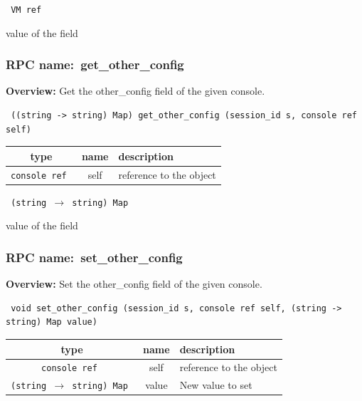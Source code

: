\vspace{0.3cm}

{\tt 
VM ref
}


value of the field
\vspace{0.3cm}
\vspace{0.3cm}
\vspace{0.3cm}
\subsubsection{RPC name:~get\_other\_config}

{\bf Overview:} 
Get the other\_config field of the given console.

\begin{verbatim} ((string -> string) Map) get_other_config (session_id s, console ref self)\end{verbatim}



 
\vspace{0.3cm}
\begin{tabular}{|c|c|p{7cm}|}
 \hline
{\bf type} & {\bf name} & {\bf description} \\ \hline
{\tt console ref } & self & reference to the object \\ \hline 

\end{tabular}

\vspace{0.3cm}

{\tt 
(string $\rightarrow$ string) Map
}


value of the field
\vspace{0.3cm}
\vspace{0.3cm}
\vspace{0.3cm}
\subsubsection{RPC name:~set\_other\_config}

{\bf Overview:} 
Set the other\_config field of the given console.

\begin{verbatim} void set_other_config (session_id s, console ref self, (string -> string) Map value)\end{verbatim}



 
\vspace{0.3cm}
\begin{tabular}{|c|c|p{7cm}|}
 \hline
{\bf type} & {\bf name} & {\bf description} \\ \hline
{\tt console ref } & self & reference to the object \\ \hline 

{\tt (string $\rightarrow$ string) Map } & value & New value to set \\ \hline 

\end{tabular}

